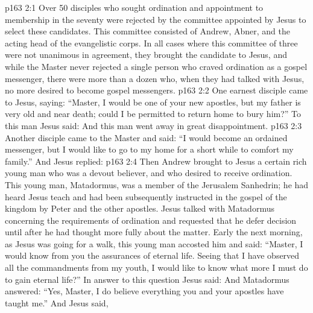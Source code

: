 \vs p163 2:1 Over 50 disciples who sought ordination and appointment to membership in the seventy were rejected by the committee appointed by Jesus to select these candidates. This committee consisted of Andrew, Abner, and the acting head of the evangelistic corps. In all cases where this committee of three were not unanimous in agreement, they brought the candidate to Jesus, and while the Master never rejected a single person who craved ordination as a gospel messenger, there were more than a dozen who, when they had talked with Jesus, no more desired to become gospel messengers.
\vs p163 2:2 \pc One earnest disciple came to Jesus, saying: “Master, I would be one of your new apostles, but my father is very old and near death; could I be permitted to return home to bury him?” To this man Jesus said:  And this man went away in great disappointment.
\vs p163 2:3 Another disciple came to the Master and said: “I would become an ordained messenger, but I would like to go to my home for a short while to comfort my family.” And Jesus replied: 
\vs p163 2:4 \pc Then Andrew brought to Jesus a certain rich young man who was a devout believer, and who desired to receive ordination. This young man, Matadormus, was a member of the Jerusalem Sanhedrin; he had heard Jesus teach and had been subsequently instructed in the gospel of the kingdom by Peter and the other apostles. Jesus talked with Matadormus concerning the requirements of ordination and requested that he defer decision until after he had thought more fully about the matter. Early the next morning, as Jesus was going for a walk, this young man accosted him and said: “Master, I would know from you the assurances of eternal life. Seeing that I have observed all the commandments from my youth, I would like to know what more I must do to gain eternal life?” In answer to this question Jesus said:  And Matadormus answered: “Yes, Master, I do believe everything you and your apostles have taught me.” And Jesus said, 
